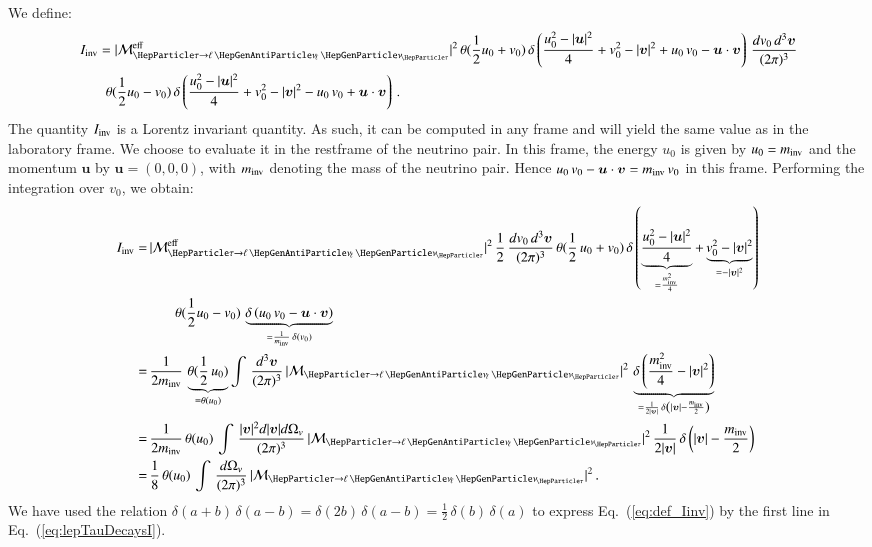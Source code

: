 We define:
\begin{align}
& \, I_{\inv} = \vert\mathcal{M}^{\eff}_{\Pgt \to
  \ellnunu}\vert^{2} \, \theta(\frac{1}{2} u_{0} + v_{0}) \, \delta
\left( \frac{u_{0}^{2} - \vert\bm{u}\vert^{2}}{4} + v_{0}^{2} - \vert\bm{v}\vert^{2} +
  u_{0} \, v_{0} - \bm{u} \cdot \bm{v} \right) \, 
  \frac{dv_{0} \, d^{3}\bm{v}}{(2\pi)^{3}} \nonumber \\
 & \qquad
  \theta(\frac{1}{2} u_{0}
  - v_{0}) \, \delta \left( \frac{u_{0}^{2} - \vert\bm{u}\vert^{2}}{4} +
    v_{0}^{2} - \vert\bm{v}\vert^{2} - u_{0} \, v_{0} + \bm{u}
    \cdot \bm{v} \right) \, .
\label{eq:def_Iinv}
\end{align}
The quantity $I_{\textrm{inv}}$ is a Lorentz invariant quantity. 
As such, it can be computed in any frame and will yield the same value as in the laboratory frame.
We choose to evaluate it in the restframe of the neutrino pair.
In this frame, the energy $u_{0}$ is given by $u_{0} = m_{\textrm{inv}}$ 
and the momentum $\bm{u}$ by $\bm{u} = ( 0, 0, 0 )$, with $m_{\textrm{inv}}$ denoting
the mass of the neutrino pair.
Hence $u_{0} \, v_{0} - \bm{u} \cdot \bm{v} = m_{\textrm{inv}} \, v_{0} $ in this frame.
Performing the integration over $v_{0}$, we obtain:
\begin{align}
I_{\inv}
= & \, \vert\mathcal{M}^{\eff}_{\Pgt \to
  \ellnunu}\vert^{2} \, \frac{1}{2} \, \frac{dv_{0} \, d^{3}\bm{v}}{(2\pi)^{3}} \, \theta ( \frac{1}{2} \, u_{0} + v_{0} ) \, 
    \delta \left( \underbrace{\frac{u_{0}^{2} - \vert\bm{u}\vert^{2}}{4}}_{=
        \frac{m^{2}_{\inv}}{4}} + \underbrace{v_{0}^{2} -
        \vert\bm{v}\vert^{2}}_{= -\vert\bm{v}\vert^{2}} \right)
    \nonumber \\
& \qquad
    \theta ( \frac{1}{2} u_{0} - v_{0} ) \, \underbrace{\delta \left(
        u_{0} \, v_{0} - \bm{u} \cdot \bm{v} \right)}_{= \frac{1}{m_{\inv}} \, \delta ( v_{0} )} \nonumber \\
= & \, \frac{1}{2 m_{\inv}} \, \underbrace{\theta ( \frac{1}{2} \, u_{0} )}_{= \theta ( u_{0} )} \int \, \frac{d^{3}\bm{v}}{(2\pi)^{3}} \, 
  \vert\mathcal{M}_{\Pgt \to
  \ellnunu}\vert^{2} \, \underbrace{\delta \left( \frac{m^{2}_{\inv}}{4} - \vert\bm{v}\vert^{2} \right)}_{
    = \frac{1}{2 \vert\bm{v}\vert} \, \delta \left( \vert\bm{v}\vert - \frac{m_{\inv}}{2} \right)} \nonumber \\
= & \, \frac{1}{2 m_{\inv}} \, \theta ( u_{0} ) \, \int \, \frac{\vert\bm{v}\vert^2 d\vert\bm{v}\vert d\Omega_{v}}{(2\pi)^{3}} \, 
  \vert\mathcal{M}_{\Pgt \to
  \ellnunu}\vert^{2} \, \frac{1}{2 \vert\bm{v}\vert} \, \delta \left( \vert\bm{v}\vert - \frac{m_{\inv}}{2} \right) \nonumber \\
= & \, \frac{1}{8} \, \theta ( u_{0} ) \, \int \, \frac{d\Omega_{v}}{(2\pi)^{3}} \, \vert\mathcal{M}_{\Pgt \to
  \ellnunu}\vert^{2} \, . 
\label{eq:lepTauDecaysI}
\end{align}
We have used the relation $\delta(a + b) \, \delta(a - b) = \delta(2b) \, \delta(a - b) = \frac{1}{2} \, \delta(b) \, \delta(a)$ 
to express Eq.~(\ref{eq:def_Iinv}) by the first line in Eq.~(\ref{eq:lepTauDecaysI}).

